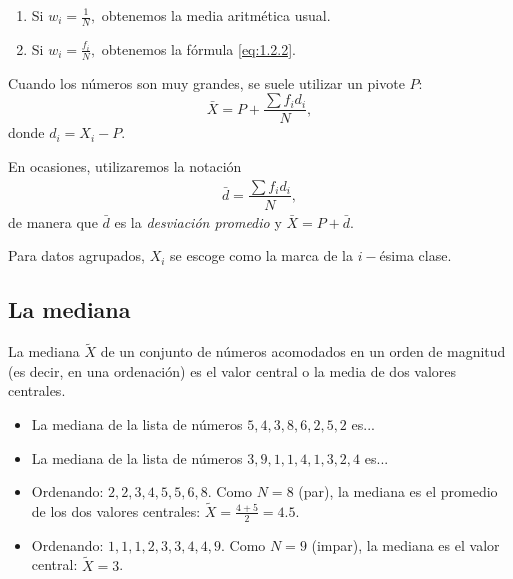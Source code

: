 \begin{enumerate}
	\item Si $w_{i}=\frac{1}{N},$ obtenemos la media aritmética usual. 
	\item Si $w_{i}=\frac{f_{i}}{N},$ obtenemos la fórmula \eqref{eq:1.2.2}.
\end{enumerate}

Cuando los números son muy grandes, se suele utilizar un pivote $P:$ 
$$
\bar{X}=P+\dfrac{\sum f_{i}d_{i}}{N},
$$
donde $d_{i}=X_{i}-P.$

En ocasiones, utilizaremos la notación
\begin{align}
	\bar{d}=\dfrac{\sum f_{i}d_{i}}{N},
\end{align}
de manera que $\bar{d}$ es la \emph{desviación promedio} y $\bar{X}=P+\bar{d}.$



\begin{observacion}
	
	Para datos agrupados, $X_{i}$ se escoge como la marca de la $i-$ésima clase.
\end{observacion}


\subsection{La mediana}
La mediana $\tilde{X}$ de un conjunto de números acomodados en un orden de magnitud (es decir, en una ordenación) es el valor central o la media de dos valores centrales.


\begin{ejemplo}
	\begin{itemize}
		\item La mediana de la lista de números $5, 4, 3, 8, 6, 2, 5, 2$ es... 
		\item La mediana de la lista de números $3, 9, 1, 1, 4, 1, 3, 2, 4$ es...
	\end{itemize}	
\end{ejemplo}

\begin{solucion}
	\begin{itemize}
		\item Ordenando: $2, 2, 3, 4, 5, 5, 6, 8$. Como $N=8$ (par), la mediana es el promedio de los dos valores centrales: $\tilde{X} = \frac{4+5}{2} = 4.5$.
		\item Ordenando: $1, 1, 1, 2, 3, 3, 4, 4, 9$. Como $N=9$ (impar), la mediana es el valor central: $\tilde{X} = 3$.
	\end{itemize}
\end{solucion}

